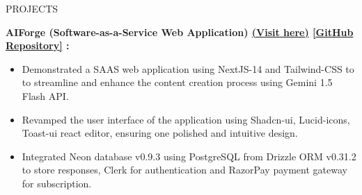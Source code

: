 \documentclass{resume} %
\begin{document}
\begin{rSection}{PROJECTS}
    \item \textbf{AIForge (Software-as-a-Service Web Application)
    {\href{https://ai-forge-plum.vercel.app/}{(Visit here)}}
    {\href{https://github.com/arkapg211002/AIForge}{[GitHub Repository]}} :} 
    \vspace{-0.6em}
    \begin{itemize}
    \setlength\itemsep{-0.6em}
     \item Demonstrated a SAAS web  application  using  NextJS-14 and Tailwind-CSS to to streamline and enhance the content creation process using Gemini 1.5 Flash API.
    \item Revamped the user interface of the application using Shadcn-ui, Lucid-icons, Toast-ui react editor, ensuring one polished and intuitive design.
    \item Integrated Neon database v0.9.3 using PostgreSQL from Drizzle ORM v0.31.2 to store responses, Clerk for authentication and RazorPay payment gateway for subscription.
    \end{itemize}
    

  
\end{rSection}
\end{document}
